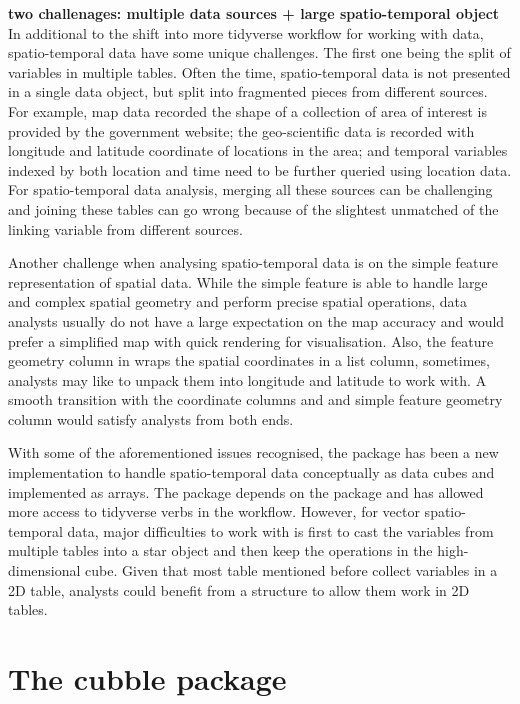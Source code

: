 \documentclass[
]{jss}
\begin{document}
\textbf{two challenages: multiple data sources + large spatio-temporal
object} In additional to the shift into more tidyverse workflow for
working with data, spatio-temporal data have some unique challenges. The
first one being the split of variables in multiple tables. Often the
time, spatio-temporal data is not presented in a single data object, but
split into fragmented pieces from different sources. For example, map
data recorded the shape of a collection of area of interest is provided
by the government website; the geo-scientific data is recorded with
longitude and latitude coordinate of locations in the area; and temporal
variables indexed by both location and time need to be further queried
using location data. For spatio-temporal data analysis, merging all
these sources can be challenging and joining these tables can go wrong
because of the slightest unmatched of the linking variable from
different sources.

Another challenge when analysing spatio-temporal data is on the simple
feature representation of spatial data. While the simple feature is able
to handle large and complex spatial geometry and perform precise spatial
operations, data analysts usually do not have a large expectation on the
map accuracy and would prefer a simplified map with quick rendering for
visualisation. Also, the feature geometry column in  wraps the
spatial coordinates in a list column, sometimes, analysts may like to
unpack them into longitude and latitude to work with. A smooth
transition with the coordinate columns and and simple feature geometry
column would satisfy analysts from both ends.

With some of the aforementioned issues recognised, the 
package has been a new implementation to handle spatio-temporal data
conceptually as data cubes and implemented as arrays. The package
depends on the  package and has allowed more access to tidyverse
verbs in the workflow. However, for vector spatio-temporal data, major
difficulties to work with  is first to cast the variables
from multiple tables into a star object and then keep the operations in
the high-dimensional cube. Given that most table mentioned before
collect variables in a 2D table, analysts could benefit from a structure
to allow them work in 2D tables.

\hypertarget{the-cubble-package}{%
\section{The cubble package}\label{the-cubble-package}}
\end{document}
